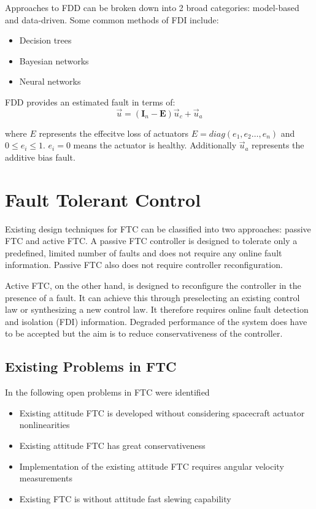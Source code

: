 Approaches to FDD can be broken down into 2 broad categories: model-based and data-driven. Some common methods of FDI include:
\begin{itemize}
    \item Decision trees
    \item Bayesian networks
    \item Neural networks
\end{itemize}

FDD provides an estimated fault in terms of:
$$\vec{u}=(\mathbf{I}_{n}-\mathbf{E})\vec{u}_{c}+\vec{u}_{a}$$

where $E$ represents the effecitve loss of actuators $E=diag(e_{1},e_{2}\dots,e_{n})$ and $0\leq e_{i}\leq 1$. 
$e_{i}=0$ means the actuator is healthy. 
Additionally $\vec{u}_{a}$ represents the additive bias fault.

\section{Fault Tolerant Control}
Existing design techniques for FTC can be classified into two approaches: passive FTC and active FTC. 
A passive FTC controller is designed to tolerate only a predefined, limited number of faults and does not require any online fault information. 
Passive FTC also does not require controller reconfiguration. \cite{yinReviewRecentDevelopment2016}

Active FTC, on the other hand, is designed to reconfigure the controller in the presence of a fault. It can achieve this through preselecting an 
existing control law or synthesizing a new control law. It therefore requires online fault detection and isolation (FDI) information. Degraded performance
of the system does have to be accepted but the aim is to reduce conservativeness of the controller. \cite{yinReviewRecentDevelopment2016}

\subsection{Existing Problems in FTC}
In \cite{yinReviewRecentDevelopment2016} the following open problems in FTC were identified
\begin{itemize}
\item Existing attitude FTC is developed without considering spacecraft actuator nonlinearities
\item Existing attitude FTC has great conservativeness
\item Implementation of the existing attitude FTC requires angular velocity measurements
\item Existing FTC is without attitude fast slewing capability
\end{itemize}

